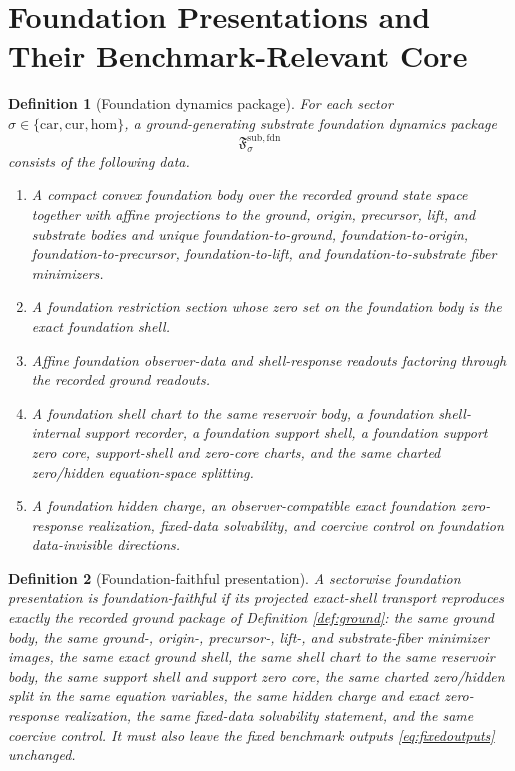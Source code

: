 \documentclass[11pt]{article}
\newcommand{\Car}{\mathrm{car}}
\newcommand{\Cur}{\mathrm{cur}}
\newcommand{\Hom}{\mathrm{hom}}
\newcommand{\FoundationPackage}{\mathfrak F^{\mathrm{sub,fdn}}}
\newtheorem{definition}{Definition}
\begin{document}
\section{Foundation Presentations and Their Benchmark-Relevant Core}

\begin{definition}[Foundation dynamics package]
\label{def:foundation}
For each sector \(\sigma\in\{\Car,\Cur,\Hom\}\), a \emph{ground-generating substrate foundation dynamics package}
\[
\FoundationPackage_{\sigma}
\]
consists of the following data.
\begin{enumerate}
    \item A compact convex foundation body over the recorded ground state space together with affine projections to the ground, origin, precursor, lift, and substrate bodies and unique foundation-to-ground, foundation-to-origin, foundation-to-precursor, foundation-to-lift, and foundation-to-substrate fiber minimizers.
    \item A foundation restriction section whose zero set on the foundation body is the exact foundation shell.
    \item Affine foundation observer-data and shell-response readouts factoring through the recorded ground readouts.
    \item A foundation shell chart to the same reservoir body, a foundation shell-internal support recorder, a foundation support shell, a foundation support zero core, support-shell and zero-core charts, and the same charted zero/hidden equation-space splitting.
    \item A foundation hidden charge, an observer-compatible exact foundation zero-response realization, fixed-data solvability, and coercive control on foundation data-invisible directions.
\end{enumerate}
\end{definition}

\begin{definition}[Foundation-faithful presentation]
\label{def:faithful}
A sectorwise foundation presentation is \emph{foundation-faithful} if its projected exact-shell transport reproduces exactly the recorded ground package of Definition \ref{def:ground}: the same ground body, the same ground-, origin-, precursor-, lift-, and substrate-fiber minimizer images, the same exact ground shell, the same shell chart to the same reservoir body, the same support shell and support zero core, the same charted zero/hidden split in the same equation variables, the same hidden charge and exact zero-response realization, the same fixed-data solvability statement, and the same coercive control. It must also leave the fixed benchmark outputs \eqref{eq:fixedoutputs} unchanged.
\end{definition}
\end{document}
